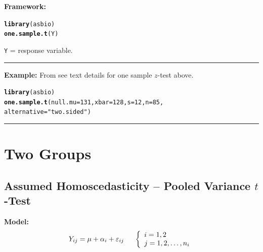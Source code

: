 \documentclass[12pt,english]{article}\usepackage[]{graphicx}\usepackage[table]{xcolor}
\makeatletter
\newcommand{\hlnum}[1]{\textcolor[rgb]{0.686,0.059,0.569}{#1}}%
\newcommand{\hlsng}[1]{\textcolor[rgb]{0.192,0.494,0.8}{#1}}%
\newcommand{\hldef}[1]{\textcolor[rgb]{0.345,0.345,0.345}{#1}}%
\newcommand{\hlkwc}[1]{\textcolor[rgb]{0.333,0.667,0.333}{#1}}%
\newcommand{\hlkwd}[1]{\textcolor[rgb]{0.737,0.353,0.396}{\textbf{#1}}}%
\newenvironment{kframe}{%
 \def\at@end@of@kframe{}%
 \ifinner\ifhmode%
  \def\at@end@of@kframe{\end{minipage}}%
  \begin{minipage}{\columnwidth}%
 \fi\fi%
 \def\FrameCommand##1{\hskip\@totalleftmargin \hskip-\fboxsep
 \colorbox{shadecolor}{##1}\hskip-\fboxsep
     \hskip-\linewidth \hskip-\@totalleftmargin \hskip\columnwidth}%
 \MakeFramed {\advance\hsize-\width
   \@totalleftmargin\z@ \linewidth\hsize
   \@setminipage}}%
 {\par\unskip\endMakeFramed%
 \at@end@of@kframe}
\newenvironment{knitrout}{}{} %
\makeatother
\begin{document}
\vspace{0.2in}
\begin{tcolorbox}[colback=yellow!50!red!25!white,colbacktitle=yellow!50!red,colframe=black!75!white,title=\textbf{R:} One Sample $t$-Test]


\textbf{Framework:}\\
\vspace{-.2in}
\begin{knitrout}
\color{fgcolor}\begin{kframe}
\begin{alltt}
\hlkwd{library}\hldef{(asbio)}
\hlkwd{one.sample.t}\hldef{(Y)}
\end{alltt}
\end{kframe}
\end{knitrout}
\vspace{-.1in}

\texttt{Y} = response variable.
\vspace{0.1in}
\par\noindent\rule{.9\textwidth}{0.4pt}

\textbf{Example:} From \citep[][pp 206-207]{aho2014} see text details for one sample $z$-test above.
\vspace{-.1in}
\begin{knitrout}
\color{fgcolor}\begin{kframe}
\begin{alltt}
\hlkwd{library}\hldef{(asbio)}
\hlkwd{one.sample.t}\hldef{(}\hlkwc{null.mu} \hldef{=} \hlnum{131}\hldef{,} \hlkwc{xbar} \hldef{=} \hlnum{128}\hldef{,} \hlkwc{s} \hldef{=} \hlnum{12}\hldef{,} \hlkwc{n} \hldef{=} \hlnum{85}\hldef{,}
             \hlkwc{alternative} \hldef{=} \hlsng{"two.sided"}\hldef{)}
\end{alltt}
\end{kframe}
\end{knitrout}
\end{tcolorbox}
\par\noindent\rule{.9\textwidth}{0.4pt}


\newpage





\section{Two Groups}
\subsection{Assumed Homoscedasticity -- Pooled Variance $t$-Test}
\textbf{Model:} \[Y_{ij} = \mu + \alpha_i + \varepsilon_{ij} \hspace{0.2in} \left\{
                \begin{array}{ll}
                  i = 1,2\\
                  j = 1,2,\dots,n_i\\
                  \end{array}
              \right.\]
\end{document}
